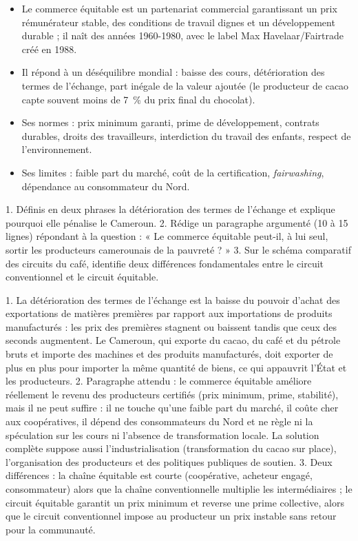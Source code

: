 \documentclass[11pt]{article}
\newcommand{\cle}[1]{{\popxbold\color{popdark}#1}}
\begin{document}
\begin{aretenir}
\begin{itemize}
\item Le \cle{commerce équitable} est un partenariat commercial garantissant un prix rémunérateur stable, des conditions de travail dignes et un développement durable ; il naît des années 1960-1980, avec le label Max Havelaar/Fairtrade créé en 1988.
\item Il répond à un déséquilibre mondial : baisse des cours, \cle{détérioration des termes de l'échange}, part inégale de la valeur ajoutée (le producteur de cacao capte souvent moins de 7~\% du prix final du chocolat).
\item Ses normes : prix minimum garanti, prime de développement, contrats durables, droits des travailleurs, interdiction du travail des enfants, respect de l'environnement.
\item Ses limites : faible part du marché, coût de la certification, \emph{fairwashing}, dépendance au consommateur du Nord.
\end{itemize}
\end{aretenir}

\begin{exercice}
1. Définis en deux phrases la détérioration des termes de l'échange et explique pourquoi elle pénalise le Cameroun.
2. Rédige un paragraphe argumenté (10 à 15 lignes) répondant à la question : « Le commerce équitable peut-il, à lui seul, sortir les producteurs camerounais de la pauvreté ? »
3. Sur le schéma comparatif des circuits du café, identifie deux différences fondamentales entre le circuit conventionnel et le circuit équitable.
\end{exercice}

\begin{corrige}
1. La détérioration des termes de l'échange est la baisse du pouvoir d'achat des exportations de matières premières par rapport aux importations de produits manufacturés : les prix des premières stagnent ou baissent tandis que ceux des seconds augmentent. Le Cameroun, qui exporte du cacao, du café et du pétrole bruts et importe des machines et des produits manufacturés, doit exporter de plus en plus pour importer la même quantité de biens, ce qui appauvrit l'État et les producteurs.
2. Paragraphe attendu : le commerce équitable améliore réellement le revenu des producteurs certifiés (prix minimum, prime, stabilité), mais il ne peut suffire : il ne touche qu'une faible part du marché, il coûte cher aux coopératives, il dépend des consommateurs du Nord et ne règle ni la spéculation sur les cours ni l'absence de transformation locale. La solution complète suppose aussi l'industrialisation (transformation du cacao sur place), l'organisation des producteurs et des politiques publiques de soutien.
3. Deux différences : la chaîne équitable est courte (coopérative, acheteur engagé, consommateur) alors que la chaîne conventionnelle multiplie les intermédiaires ; le circuit équitable garantit un prix minimum et reverse une prime collective, alors que le circuit conventionnel impose au producteur un prix instable sans retour pour la communauté.
\end{corrige}
\end{document}
